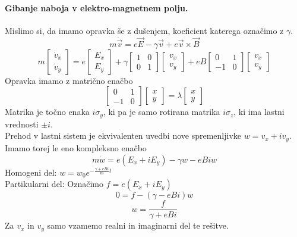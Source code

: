 \documentclass[a4paper]{article}
\newcommand{\vct}[1]{\overrightarrow{#1}}
\begin{document}
\paragraph{Gibanje naboja v elektro-magnetnem polju.} Mislimo si, da imamo opravka še z dušenjem, koeficient katerega označimo z $\gamma$.
$$m\dot{\vct{v}} = e\vct{E} - \gamma\vct{v} + e\vct{v}\times\vct{B}$$
$$m\begin{bmatrix}
    \dot{v}_x \\ \dot{v}_y
\end{bmatrix} = e \begin{bmatrix}
    E_x \\ E_y
\end{bmatrix} + \gamma \begin{bmatrix}
    1 & 0 \\
    0 & 1
\end{bmatrix}\begin{bmatrix}
    v_x \\ v_y
\end{bmatrix} + eB \begin{bmatrix}
    0 & 1 \\
    -1 & 0
\end{bmatrix} \begin{bmatrix}
    v_x \\ v_y
\end{bmatrix}$$
Opravka imamo z matrično enačbo
$$\begin{bmatrix}
    0 & 1 \\
    -1 & 0
\end{bmatrix} \begin{bmatrix}
    x \\ y
\end{bmatrix} = \lambda \begin{bmatrix}
    x \\ y
\end{bmatrix}$$
Matrika je točno enaka $i\sigma_y$, ki pa je samo rotirana matrika $i\sigma_z$, ki ima lastni vrednosti $\pm i$. \\
Prehod v lastni sistem je ekvivalenten uvedbi nove spremenljivke $w = v_x + iv_y$. Imamo torej le eno kompleksno enačbo
$$m \dot w = e (E_x + iE_y) - \gamma w - eBiw$$
Homogeni del: $\displaystyle{w = w_0 e^{-\frac{\gamma + eBi}{m}t}}$ \\
Partikularni del: Označimo $f = e(E_x + iE_y)$
$$0 = f - (\gamma - eBi)w$$
$$w = \frac{f}{\gamma + eBi}$$
Za $v_x$ in $v_y$ samo vzamemo realni in imaginarni del te rešitve.
\end{document}
